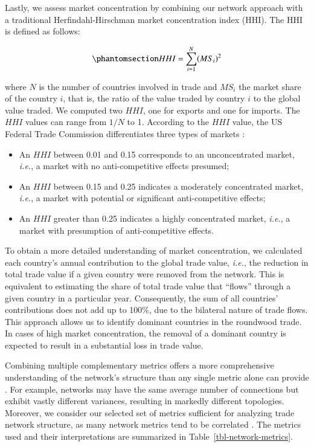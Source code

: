 \documentclass[
  authoryear,
  review,
  3p]{elsarticle}
\providecommand{\tightlist}{%
  \setlength{\itemsep}{0pt}\setlength{\parskip}{0pt}}
\begin{document}
Lastly, we assess market concentration by combining our network approach
with a traditional Herfindahl-Hirschman market concentration index
(HHI). The HHI is defined as follows:

\begin{equation}\phantomsection\label{eq-HHI}{
HHI = \sum^{N}_{i = 1} (MS_{i})^{2}
}\end{equation}

where \(N\) is the number of countries involved in trade and \(MS_{i}\)
the market share of the country \(i\), that is, the ratio of the value
traded by country \(i\) to the global value traded. We computed two
\(HHI\), one for exports and one for imports. The \(HHI\) values can
range from \(1/N\) to 1. According to the \(HHI\) value, the US Federal
Trade Commission differentiates three types of markets
\citep{us_department_of_justice_and_the_federal_trade_commission_horizontal_2010}:

\begin{itemize}
\tightlist
\item
  An \(HHI\) between 0.01 and 0.15 corresponds to an unconcentrated
  market, \emph{i.e.}, a market with no anti-competitive effects
  presumed;
\item
  An \(HHI\) between 0.15 and 0.25 indicates a moderately concentrated
  market, \emph{i.e.}, a market with potential or significant
  anti-competitive effects;
\item
  An \(HHI\) greater than 0.25 indicates a highly concentrated market,
  \emph{i.e.}, a market with presumption of anti-competitive effects.
\end{itemize}

To obtain a more detailed understanding of market concentration, we
calculated each country's annual contribution to the global trade value,
\emph{i.e.}, the reduction in total trade value if a given country were
removed from the network. This is equivalent to estimating the share of
total trade value that ``flows'' through a given country in a particular
year. Consequently, the sum of all countries' contributions does not add
up to 100\%, due to the bilateral nature of trade flows. This approach
allows us to identify dominant countries in the roundwood trade. In
cases of high market concentration, the removal of a dominant country is
expected to result in a substantial loss in trade value.

Combining multiple complementary metrics offers a more comprehensive
understanding of the network's structure than any single metric alone
can provide \citep{shanafelt_-it-yourself_2017, salau_taking_2022}. For
example, networks may have the same average number of connections but
exhibit vastly different variances, resulting in markedly different
topologies. Moreover, we consider our selected set of metrics sufficient
for analyzing trade network structure, as many network metrics tend to
be correlated \citep{baggio_landscape_2011}. The metrics used and their
interpretations are summarized in Table~\ref{tbl-network-metrics}.
\end{document}
